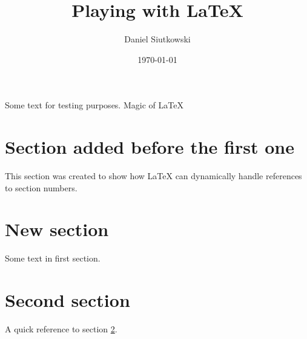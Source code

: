 \documentclass[a4paper,12pt]{article}
\begin{document}
\title{Playing with \LaTeX}
\author{Daniel Siutkowski}
\date{\today}

\maketitle

Some text for testing purposes. Magic of \LaTeX

\blindtext

\section{Section added before the first one}%
\label{sec:section_added_before_the_first_one}

This section was created to show how \LaTeX{} can dynamically handle references to section numbers.

\section{New section}%
\label{sec:new_section}

Some text in first section.

\section{Second section}%
\label{sec:second_section}

A quick reference to section \ref{sec:new_section}.
\end{document}
